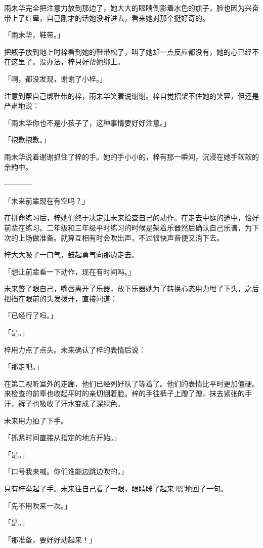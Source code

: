 \documentclass[UTF8]{ctexart}
\begin{document}
    雨未华完全把注意力放到那边了，她大大的眼睛倒影着水色的旗子，脸也因为兴奋带上了红晕，自己刚才的话她没听进去，看来她对那个挺好奇的。

    「雨未华，鞋带。」

    把瓶子放到地上时梓看到她的鞋带松了，叫了她却一点反应都没有，她的心已经不在这里了。没办法，梓只好帮她绑上。

    「啊，都没发现，谢谢了小梓。」

    注意到帮自己绑鞋带的梓，雨未华笑着说谢谢。梓自觉招架不住她的笑容，但还是严肃地说：

    「雨未华你也不是小孩子了，这种事情要好好注意。」

    「抱歉抱歉。」

    雨未华说着谢谢抓住了梓的手。她的手小小的，梓有那一瞬间，沉浸在她手软软的余韵中。

    ————

    「未来前辈现在有空吗？」

    在拼命练习后，梓她们终于决定让未来检查自己的动作。在走去中庭的途中，恰好前辈在练习。二年级和三年级平时练习的时候是架着乐器然后确认自己乐谱，为下次的上场做准备。就算互相有时会吹出声，不过很快声音便又消下去。

    梓大大吸了一口气，鼓起勇气向那边走去。

    「想让前辈看一下动作，现在有时间吗。」

    未来瞥了眼自己，嘴唇离开了乐器，放下乐器她为了转换心态用力甩了下头，之后把挡在眼前的头发拨开，直接问道：

    「已经行了吗。」

    「是。」

    梓用力点了点头。未来确认了梓的表情后说：

    「那走吧。」

    在第二视听室外的走廊，他们已经列好队了等着了。他们的表情比平时更加僵硬。来检查的前辈也收起平时的亲切绷着脸。梓的手往裤子上蹭了蹭，抹去紧张的手汗，裤子也吸收了汗水变成了深绿色。

    未来用力拍了下手。

    「抓紧时间直接从指定的地方开始。」

    「是。」

    「口号我来喊。你们谁能边跳边吹的。」

    只有梓举起了手。未来往自己看了一眼，眼睛眯了起来‘嗯’地回了一句。

    「先不用吹来一次。」

    「是。」

    「那准备，要好好动起来！」
\end{document}
